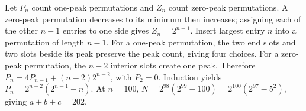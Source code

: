 Let $P_n$ count one-peak permutations and $Z_n$ count zero-peak permutations. A zero-peak permutation decreases to its minimum then increases; assigning each of the other $n-1$ entries to one side gives $Z_n=2^{n-1}$. Insert largest entry $n$ into a permutation of length $n-1$. For a one-peak permutation, the two end slots and two slots beside its peak preserve the peak count, giving four choices. For a zero-peak permutation, the $n-2$ interior slots create one peak. Therefore $P_n=4P_{n-1}+(n-2)2^{n-2}$, with $P_2=0$. Induction yields $P_n=2^{n-2}(2^{n-1}-n)$. At $n=100$, $N=2^{98}(2^{99}-100)=2^{100}(2^{97}-5^2)$, giving $\boxed{a+b+c=202}$.
